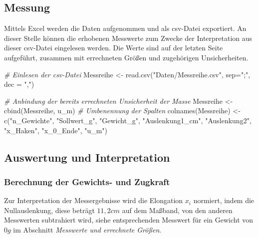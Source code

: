 \documentclass[
  9pt,
]{article}
\newenvironment{Shaded}{\begin{snugshade}}{\end{snugshade}}
\newcommand{\AttributeTok}[1]{\textcolor[rgb]{0.77,0.63,0.00}{#1}}
\newcommand{\CommentTok}[1]{\textcolor[rgb]{0.56,0.35,0.01}{\textit{#1}}}
\newcommand{\FunctionTok}[1]{\textcolor[rgb]{0.00,0.00,0.00}{#1}}
\newcommand{\NormalTok}[1]{#1}
\newcommand{\OtherTok}[1]{\textcolor[rgb]{0.56,0.35,0.01}{#1}}
\newcommand{\StringTok}[1]{\textcolor[rgb]{0.31,0.60,0.02}{#1}}
\begin{document}
\hypertarget{messung}{%
\subsection{Messung}\label{messung}}

Mittels Excel werden die Daten aufgenommen und als csv-Datei exportiert.
An dieser Stelle können die erhobenen Messwerte zum Zwecke der
Interpretation aus dieser csv-Datei eingelesen werden. Die Werte sind
auf der letzten Seite aufgeführt, zusammen mit errechneten Größen und
zugehörigen Unsicherheiten.

\begin{Shaded}
\begin{Highlighting}[]
\CommentTok{\# Einlesen der csv{-}Datei}
\NormalTok{Messreihe }\OtherTok{\textless{}{-}} \FunctionTok{read.csv}\NormalTok{(}\StringTok{"Daten/Messreihe.csv"}\NormalTok{, }\AttributeTok{sep=}\StringTok{";"}\NormalTok{, }\AttributeTok{dec =} \StringTok{","}\NormalTok{)}

\CommentTok{\# Anbindung der bereits errechneten Unsicherheit der Masse}
\NormalTok{Messreihe }\OtherTok{\textless{}{-}} \FunctionTok{cbind}\NormalTok{(Messreihe, u\_m)}
\CommentTok{\# Umbenennung der Spalten}
\FunctionTok{colnames}\NormalTok{(Messreihe) }\OtherTok{\textless{}{-}} \FunctionTok{c}\NormalTok{(}\StringTok{"n\_Gewichte"}\NormalTok{, }\StringTok{"Sollwert\_g"}\NormalTok{, }\StringTok{"Gewicht\_g"}\NormalTok{, }
                         \StringTok{"Auslenkung1\_cm"}\NormalTok{,  }\StringTok{"Auslenkung2"}\NormalTok{, }\StringTok{"x\_Haken"}\NormalTok{, }
                         \StringTok{"x\_0\_Ende"}\NormalTok{, }\StringTok{"u\_m"}\NormalTok{)}
\end{Highlighting}
\end{Shaded}

\hypertarget{auswertung-und-interpretation}{%
\subsection{Auswertung und
Interpretation}\label{auswertung-und-interpretation}}

\hypertarget{berechnung-der-gewichts--und-zugkraft}{%
\subsubsection{Berechnung der Gewichts- und
Zugkraft}\label{berechnung-der-gewichts--und-zugkraft}}

Zur Interpretation der Messergebnisse wird die Elongation \(x_i\)
normiert, indem die Nullauslenkung, diese beträgt \(11,2 cm\) auf dem
Maßband, von den anderen Messwerten subtrahiert wird, siehe
entsprechenden Messwert für ein Gewicht von \(0g\) im Abschnitt
\textit{Messwerte und errechnete Größen}.
\end{document}
